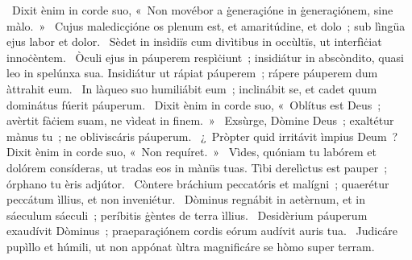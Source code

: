 {~Dixit ènim in corde suo, «~Non movébor a ġeneraçióne in ġeneraçiónem, sine màlo.~»
~Cujus maledicçióne os plenum est, et amaritúdine, et dolo~; sub lìngüa ejus labor et dolor.
~Sèdet in insìdiïs cum divìtibus in occùltïs, ut interfìċiat innoċèntem.
~Òculi ejus in páuperem respìċiunt~; insidiátur in abscòndito, quasi leo in spelúnxa sua. Insidiátur ut rápiat páuperem~; rápere páuperem dum àttrahit eum.
~In làqueo suo humiliábit eum~; inclinábit se, et cadet quum dominátus fúerit páuperum.
~Dixit ènim in corde suo, «~Oblítus est Deus~; avèrtit fàċiem suam, ne vìdeat in finem.~»
~Exsùrge, Dòmine Deus~; exaltétur mànus tu~; ne obliviscáris páuperum.
~¿~Pròpter quid irritávit ìmpius Deum~? Dixit ènim in corde suo, «~Non requíret.~»
~Vìdes, quóniam tu labórem et dolórem consíderas, ut tradas eos in mànüs tuas. Tìbi derelìctus est pauper~; órphano tu èris adjútor.
~Còntere bráchium peccatóris et malígni~; quaerétur peccátum ìllius, et non inveniétur.
~Dòminus regnábit in aetèrnum, et in sáeculum sáeculi~; períbitis ġèntes de terra ìllius.
~Desidèrium páuperum exaudívit Dòminus~; praeparaçiónem cordis eórum audívit auris tua.
~Judicáre pupìllo et húmili, ut non appónat ùltra magnificáre se hòmo super terram.
}
